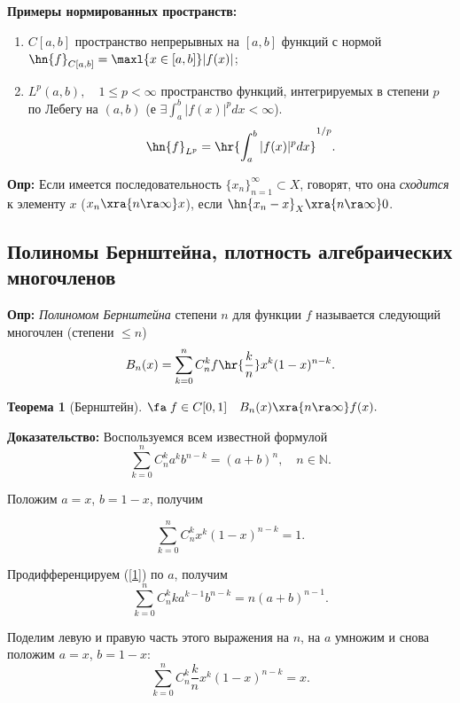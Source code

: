 \documentclass[a4paper]{article}
\begin{document}
\noindent\textbf{Примеры нормированных пространств:}
\begin{enumerate}
\item
$C[a,b]$ пространство непрерывных на $[a,b]$ функций с нормой
$\hn{f}_{C[a,b]}=\maxl{x\in[a,b]}|f(x)|$;
\item
$L^p(a,b),\quad 1\le p<\infty$ пространство функций,
интегрируемых в степени $p$ по Лебегу на $(a,b)$ (е $\exi\int_a^b|f(x)|^pdx<\infty$).
$$\hn{f}_{L^p}=\hr{\int_a^b|f(x)|^pdx }^{1/p}.$$

\end{enumerate}

\noindent\textbf{Опр:} Если имеется последовательность
$\{x_n\}_{n=1}^{\infty}\subset X$, говорят, что она
\emph{сходится} к элементу $x$ ($x_n\xra{n\ra\infty} x$), если
$\hn{x_n-x}_X\xra{n\ra\infty} 0$.

\subsection{Полиномы Бернштейна, плотность алгебраических
многочленов}

\textbf{Опр:} \emph{Полиномом Бернштейна} степени $n$ для функции
$f$ называется следующий многочлен (степени $\le n$)
$$B_n(x)=\sum\limits_{k=0}^n C_n^k f\hr{\frac{k}{n}}x^k(1-x)^{n-k}.$$
\newtheorem{theorems}{Теорема}[section]
\newtheorem{lemms}{Лемма}[section]
\newtheorem{sled}{Следствие}[section]
\newtheorem{utv}{Утверждение}[section]
\begin{theorems}[Бернштейн]
$\fa \;f\in C[0,1]\quad B_n(x)\xra{n\ra\infty}
f(x).$
\end{theorems}
\textbf{Доказательство:} Воспользуемся всем известной формулой
\begin{equation}\label{1}
\sum_{k=0}^n C_n^k a^k b^{n-k}=(a+b)^n,\quad n\in\mathbb{N}.
\end{equation}

Положим $a=x$, $b=1-x$, получим

\begin{equation}\label{2}
\sum_{k=0}^n C_n^k x^k (1-x)^{n-k}=1.
\end{equation}

Продифференцируем (\ref{1}) по $a$, получим
\begin{equation}\label{3}
\sum_{k=0}^n C_n^k ka^{k-1} b^{n-k}=n(a+b)^{n-1}.
\end{equation}

Поделим левую и правую часть этого выражения на $n$, на $a$ умножим и снова положим $a=x$, $b=1-x$:
\begin{equation}\label{4}
\sum_{k=0}^n C_n^k \frac{k}{n}x^k(1-x)^{n-k}=x.
\end{equation}
\end{document}
